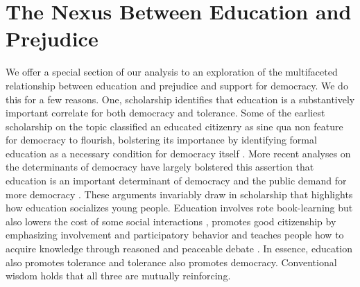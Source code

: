\documentclass[11pt,]{article}
\begin{document}
\hypertarget{the-nexus-between-education-and-prejudice}{%
\section{The Nexus Between Education and
Prejudice}\label{the-nexus-between-education-and-prejudice}}

We offer a special section of our analysis to an exploration of the
multifaceted relationship between education and prejudice and support
for democracy. We do this for a few reasons. One, scholarship identifies
that education is a substantively important correlate for both democracy
and tolerance. Some of the earliest scholarship on the topic classified
an educated citizenry as sine qua non feature for democracy to flourish,
bolstering its importance by identifying formal education as a necessary
condition for democracy itself \citep{dewey1916de, lipset1959ssr}. More
recent analyses on the determinants of democracy have largely bolstered
this assertion that education is an important determinant of democracy
and the public demand for more democracy
\citep[e.g.][]{barro1999dd, sanbornthyne2014ld}. These arguments
invariably draw in scholarship that highlights how education socializes
young people. Education involves rote book-learning but also lowers the
cost of some social interactions \citep{glaeseretal2007wddn}, promotes
good citizenship by emphasizing involvement and participatory behavior
\citep{glaeseretal2007wddn, holmes1979iges} and teaches people how to
acquire knowledge through reasoned and peaceable debate
\citep{bowlesgintis1976sca}. In essence, education also promotes
tolerance and tolerance also promotes democracy. Conventional wisdom
holds that all three are mutually reinforcing.
\end{document}
